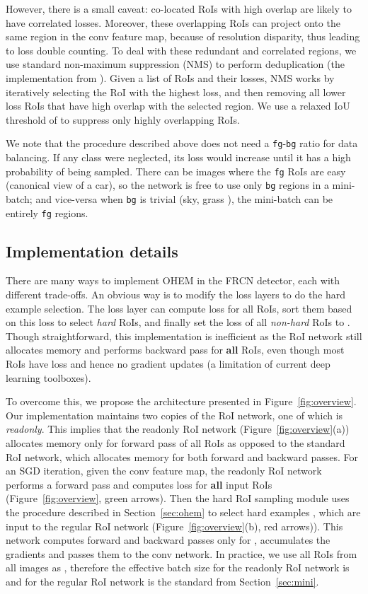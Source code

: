 \documentclass[10pt,twocolumn,letterpaper]{article}
\begin{document}
However, there is a small caveat: co-located RoIs with high overlap are likely to have correlated losses. Moreover, these overlapping RoIs can project onto the same region in the conv feature map, because of resolution disparity, thus leading to loss double counting. To deal with these redundant and correlated regions, we use standard non-maximum suppression (NMS) to perform deduplication (the implementation from \cite{frcn}). Given a list of RoIs and their losses, NMS works by iteratively selecting the RoI with the highest loss, and then removing all lower loss RoIs that have high overlap with the selected region. We use a relaxed IoU threshold of  to suppress only highly overlapping RoIs.

We note that the procedure described above does not need a \texttt{fg}-\texttt{bg} ratio for data balancing. If any class were neglected, its loss would increase until it has a high probability of being sampled. There can be images where the \texttt{fg} RoIs are easy (\eg canonical view of a car), so the network is free to use only \texttt{bg} regions in a mini-batch; and vice-versa when \texttt{bg} is trivial (\eg sky, grass \etc), the mini-batch can be entirely \texttt{fg} regions.



\subsection{Implementation details}\label{sec:details}
There are many ways to implement OHEM in the FRCN detector, each with different trade-offs. An obvious way is to modify the loss layers to do the hard example selection. The loss layer can compute loss for all RoIs, sort them based on this loss to select \emph{hard} RoIs, and finally set the loss of all \emph{non-hard} RoIs to . Though straightforward, this implementation is inefficient as the RoI network still allocates memory and performs backward pass for \textbf{all} RoIs, even though most RoIs have  loss and hence no gradient updates (a limitation of current deep learning toolboxes).

To overcome this, we propose the architecture presented in Figure~\ref{fig:overview}. Our implementation maintains two copies of the RoI network, one of which is \emph{readonly}. This implies that the readonly RoI network (Figure~\ref{fig:overview}(a)) allocates memory only for forward pass of all RoIs as opposed to the standard RoI network, which allocates memory for both forward and backward passes. For an SGD iteration, given the conv feature map, the readonly RoI network performs a  forward pass and computes loss for \textbf{all} input RoIs  (Figure~\ref{fig:overview}, {\color{green} green} arrows). Then the hard RoI sampling module uses the procedure described in Section~\ref{sec:ohem} to select hard examples , which are input to the regular RoI network (Figure~\ref{fig:overview}(b), {\color{red} red} arrows)). This network computes forward and backward passes only for , accumulates the gradients and passes them to the conv network. In practice, we use all RoIs from all  images as , therefore the effective batch size for the readonly RoI network is  and for the regular RoI network is the standard  from Section~\ref{sec:mini}.
\end{document}
